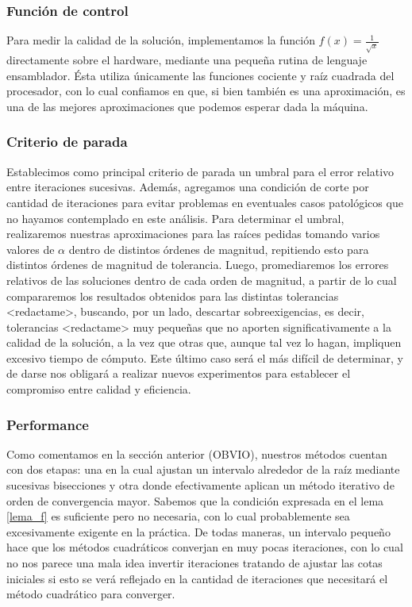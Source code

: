 	\subsubsection{Función de control}
Para medir la calidad de la solución, implementamos la función $f(x) = \frac{1}{\sqrt{x}}$ directamente sobre el hardware, mediante una pequeña rutina de lenguaje ensamblador. Ésta utiliza únicamente las funciones cociente y raíz cuadrada del procesador, con lo cual confiamos en que, si bien también es una aproximación, es una de las mejores aproximaciones que podemos esperar dada la máquina.

	\subsubsection{Criterio de parada}
Establecimos como principal criterio de parada un umbral para el error relativo entre iteraciones sucesivas. Además, agregamos una condición de corte por cantidad de iteraciones para evitar problemas en eventuales casos patológicos que no hayamos contemplado en este análisis. Para determinar el umbral, realizaremos nuestras aproximaciones para las raíces pedidas tomando varios valores de $\alpha$ dentro de distintos órdenes de magnitud, repitiendo esto para distintos órdenes de magnitud de tolerancia. Luego, promediaremos los errores relativos de las soluciones dentro de cada orden de magnitud, a partir de lo cual compararemos los resultados obtenidos para las distintas tolerancias <redactame>, buscando, por un lado, descartar sobreexigencias, es decir, tolerancias <redactame> muy pequeñas que no aporten significativamente a la calidad de la solución, a la vez que otras que, aunque tal vez lo hagan, impliquen excesivo tiempo de cómputo. Este último caso será el más difícil de determinar, y de darse nos obligará a realizar nuevos experimentos para establecer el compromiso entre calidad y eficiencia.

	\subsubsection{Performance}
Como comentamos en la sección anterior (OBVIO), nuestros métodos cuentan con dos etapas: una en la cual ajustan un intervalo alrededor de la raíz mediante sucesivas bisecciones y otra donde efectivamente aplican un método iterativo de orden de convergencia mayor. Sabemos que la condición expresada en el lema \ref{lema_f} es suficiente pero no necesaria, con lo cual probablemente sea excesivamente exigente en la práctica. De todas maneras, un intervalo pequeño hace que los métodos cuadráticos converjan en muy pocas iteraciones, con lo cual no nos parece una mala idea invertir iteraciones tratando de ajustar las cotas iniciales si esto se verá reflejado en la cantidad de iteraciones que necesitará el método cuadrático para converger.

